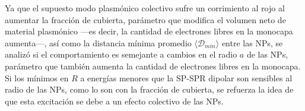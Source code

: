 Ya que el supuesto modo plasmónico colectivo sufre un corrimiento al rojo al aumentar la fracción de cubierta, parámetro que modifica el volumen neto de material plasmónico ---es decir, la cantidad de electrones libres en la monocapa aumenta---, así como la distancia mínima promedio $\langle\mathscr{D}_{min}\rangle$ entre las NPs, se analizó si el comportamiento es semejante a cambios en el radio $a$ de las NPs, parámetro que también aumenta la cantidad de electrones libres en la monocapa. Si  los mínimos en $R$  a energías menores que la SP-SPR dipolar son sensibles al radio de las NPs, como lo son con la fracción de cubierta, se refuerza la idea de que esta excitación se debe a un efecto colectivo de las NPs.
 
\begin{figure}[h!]\centering
\hspace*{-.5em}
\end{figure}
